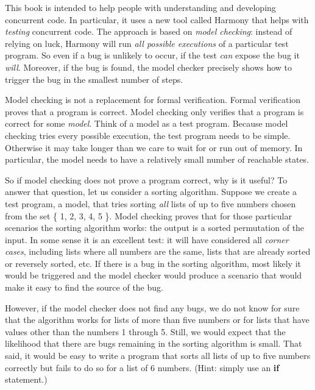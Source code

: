 \documentclass{report}
\begin{document}
This book is intended to help people with understanding and
developing concurrent code.  In particular, it uses a new tool
called Harmony that helps with \emph{testing} concurrent code.
The approach is based on \emph{model checking}:
%
instead of relying
on luck, Harmony will run \emph{all possible executions} of a particular
test program.  So even if a bug is unlikely to occur, if the test
\emph{can} expose the bug it \emph{will}.  Moreover, if the bug is
found, the model checker precisely shows how to trigger the bug in
the smallest number of steps.

Model checking is not a replacement for formal verification.
%
Formal verification proves that a program is correct.  Model checking only
verifies that a program is correct for some \emph{model}.  Think of
a model as a test program.
Because model checking tries every possible execution, the test
program needs to be simple. Otherwise it may take longer than we
care to wait for or run out of memory.
In particular, the model needs to have a relatively small number of
reachable states.

So if model checking does not prove a program correct, why is it
useful?
To answer that question, let us consider a sorting algorithm.
Suppose we create a test program, a model, that tries sorting
\emph{all} lists of up to five numbers chosen from the set
\{ 1, 2, 3, 4, 5 \}.  Model checking proves that for those particular
scenarios the sorting algorithm works: the output is a sorted
permutation of the input.  In some sense it is an excellent test:
it will have considered all \emph{corner cases},
%
including lists where all
numbers are the same, lists that are already sorted or reversely
sorted, etc.  If there is a bug in the sorting algorithm, most
likely it would be triggered and the model checker would produce a
scenario that would make it easy to find the source of the bug.

However, if the model checker does not find any bugs, we do not
know for sure that the algorithm works for lists of more than
five numbers or for lists that have values other than the numbers
1 through 5.  Still, we would expect that the likelihood that there
are bugs remaining in the sorting algorithm is small.
That said, it would be easy to write a program
that sorts all lists of up to five numbers correctly but fails to
do so for a list of 6 numbers.  (Hint: simply use an \textbf{if}
statement.)

%
\end{document}
